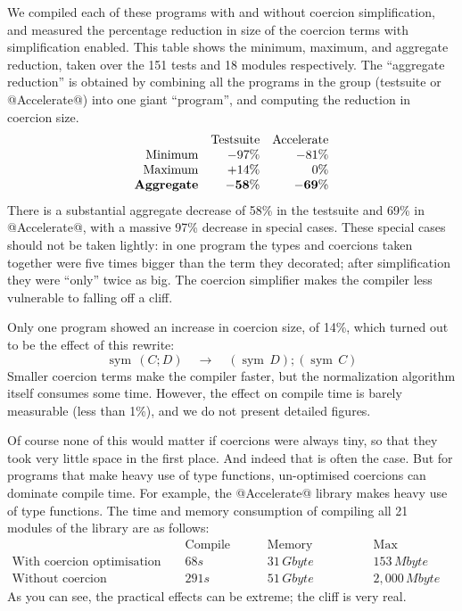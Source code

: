 \documentclass[a4paper,UKenglish]{lipics}
\newcommand{\sym}[1]{\mathop{sym}\, #1}
\begin{document}
We compiled each of these programs with and without coercion simplification, 
and measured the percentage reduction in size of the coercion terms with
simplification enabled.  This table shows the minimum, maximum, and 
aggregate reduction, taken over the 151 tests and 18 modules respectively.
The ``aggregate reduction'' is obtained by combining all the programs
in the group (testsuite or @Accelerate@) into one giant ``program'', and computing
the reduction in coercion size.
$$
\begin{array}{rrr}
& \text{Testsuite} & \text{Accelerate} \\
\text{Minimum} & -97\% & -81\%\\
\text{Maximum} & +14\% & 0\% \\
\text{\bf Aggregate} & {\bf -58\% } & {\bf -69\%}
\end{array}
$$
There is a substantial aggregate decrease of 58\% in the testsuite
and 69\% in @Accelerate@, with a massive 97\% decrease
in special cases. These special cases should not be taken lightly: 
in one program the types and coercions taken together were five times
bigger than the term they decorated; after simplification they were ``only''
twice as big.  The coercion simplifier makes the compiler less vulnerable to
falling off a cliff.

Only one program showed an increase in coercion size, of 14\%, which turned out to be the
effect of this rewrite:
$$ \sym{(C ;  D)} \quad \longrightarrow \quad (\sym{D});(\sym{C}) $$
Smaller coercion terms make the 
compiler faster, but the normalization algorithm itself consumes some time.
However, the effect on compile time is barely measurable (less than 1\%), and we 
do not present detailed figures.

Of course none of this would matter if coercions were always tiny, so that they
took very little space in the first place.  And indeed that is often the case.
But for programs that make heavy use of type functions, un-optimised coercions 
can dominate compile time. For example, the @Accelerate@ library makes
heavy use of type functions.  The time and memory consumption of compiling
all 21 modules of the library are as follows:
$$
\begin{array}{lrrr}
                                     & \text{Compile time}  & \text{Memory allocated} & \text{Max residency} \\
\text{With coercion optimisation}    & 68s           & 31\, Gbyte & 153\, Mbyte \\
\text{Without coercion optimisation} & 291s          & 51\, Gbyte & 2,000\, Mbyte 
\end{array}
$$
As you can see, the practical effects can be extreme; the cliff is very real.
\end{document}
